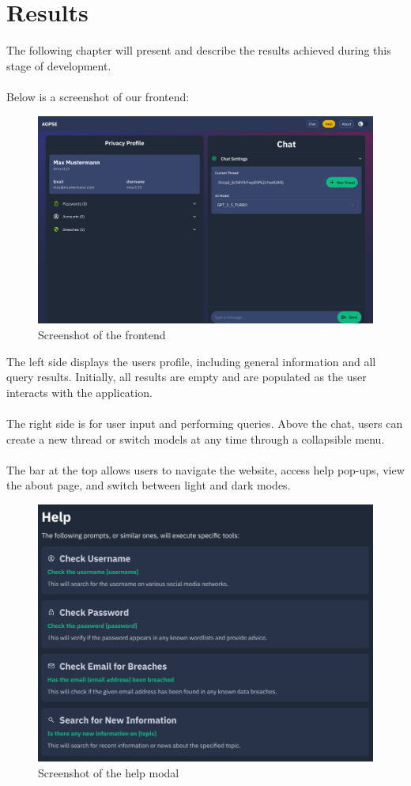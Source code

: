\documentclass[
    a4paper,
    pagesize,
	pdftex,
    12pt,
]{scrartcl}
\begin{document}
\section{Results}
The following chapter will present and describe the results achieved during this stage of development.
\\ \\
Below is a screenshot of our frontend:
\begin{figure}[H]
	\centering
	\includegraphics[width=15cm]{Frontend-final.png}
	\caption{Screenshot of the frontend}
	\label{fig:frondent-final}
\end{figure}
The left side displays the users profile, including general information and all query results. Initially, all results are empty and are populated as the user interacts with the application.
\\ \\
The right side is for user input and performing queries. Above the chat, users can create a new thread or switch models at any time through a collapsible menu.
\\ \\
The bar at the top allows users to navigate the website, access help pop-ups, view the about page, and switch between light and dark modes.
\begin{figure}[H]
	\centering
	\includegraphics[width=13cm]{Frontend-help-modal.png}
	\caption{Screenshot of the help modal}
	\label{fig:frondent-help-modal}
\end{figure}
\end{document}
